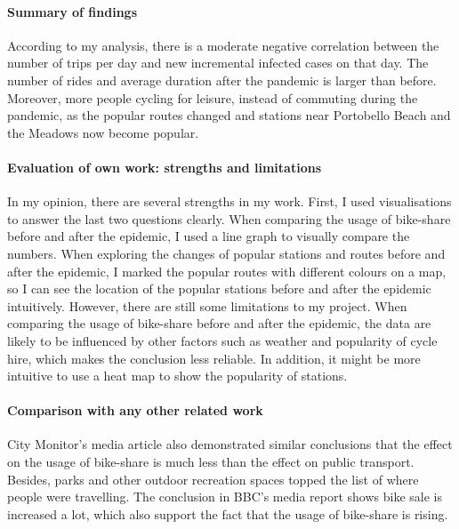 \documentclass[11pt,a4paper]{article}
\begin{document}
\paragraph{Summary of findings}

According to my analysis, there is a moderate negative correlation between the number of trips per day and new incremental infected cases on that day. The number of rides and average duration after the pandemic is larger than before. Moreover, more people cycling for leisure, instead of commuting during the pandemic, as the popular routes changed and stations near Portobello Beach and the Meadows now become popular.

\paragraph{Evaluation of own work: strengths and limitations}

In my opinion, there are several strengths in my work. First, I used visualisations to answer the last two questions clearly. When comparing the usage of bike-share before and after the epidemic, I used a line graph to visually compare the numbers. When exploring the changes of popular stations and routes before and after the epidemic, I marked the popular routes with different colours on a map, so I can see the location of the popular stations before and after the epidemic intuitively. However, there are still some limitations to my project. When comparing the usage of bike-share before and after the epidemic, the data are likely to be influenced by other factors such as weather and popularity of cycle hire, which makes the conclusion less reliable. In addition, it might be more intuitive to use a heat map to show the popularity of stations.

\paragraph{Comparison with any other related work}

City Monitor’s media article also demonstrated similar conclusions that the effect on the usage of bike-share is much less than the effect on public transport. Besides, parks and other outdoor recreation spaces topped the list of where people were travelling. The conclusion in BBC’s media report shows bike sale is increased a lot, which also support the fact that the usage of bike-share is rising.

\end{document}
